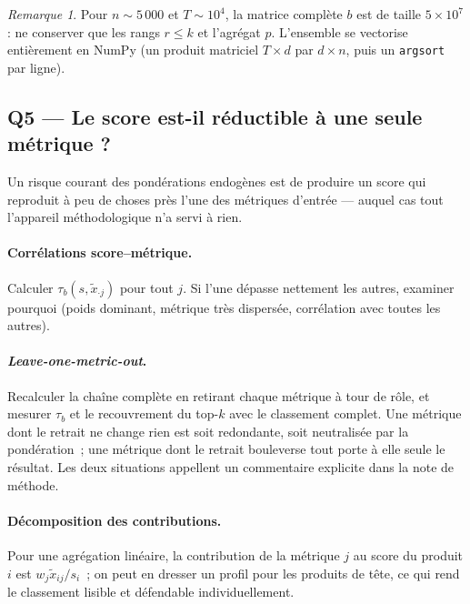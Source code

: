 \documentclass[11pt,a4paper]{article}
\theoremstyle{definition}
\theoremstyle{remark}
\newtheorem{remarque}{Remarque}[section]
\begin{document}
\bigskip

\begin{remarque}
  Pour $n \sim 5\,000$ et $T \sim 10^4$, la matrice complète $b$ est de taille $5\times10^7$: ne
  conserver que les rangs $r \le k$ et l'agrégat $p$. L'ensemble se vectorise entièrement en NumPy
  (un produit matriciel $T \times d$ par $d \times n$, puis un \texttt{argsort} par ligne).
\end{remarque}

\bigskip

\subsection{Q5 --- Le score est-il réductible à une seule métrique ?}

\medskip

Un risque courant des pondérations endogènes est de produire un score qui reproduit à peu de
choses près l'une des métriques d'entrée --- auquel cas tout l'appareil méthodologique n'a servi
à rien.

\medskip

\paragraph{Corrélations score--métrique.} Calculer $\tau_b(s, \tilde{x}_{\cdot j})$ pour tout $j$.
Si l'une dépasse nettement les autres, examiner pourquoi (poids dominant, métrique très
dispersée, corrélation avec toutes les autres).

\medskip

\paragraph{\emph{Leave-one-metric-out}.} Recalculer la chaîne complète en retirant chaque métrique
à tour de rôle, et mesurer $\tau_b$ et le recouvrement du top-$k$ avec le classement complet. Une
métrique dont le retrait ne change rien est soit redondante, soit neutralisée par la pondération~;
une métrique dont le retrait bouleverse tout porte à elle seule le résultat. Les deux situations
appellent un commentaire explicite dans la note de méthode.

\medskip

\paragraph{Décomposition des contributions.} Pour une agrégation linéaire, la contribution de la
métrique $j$ au score du produit $i$ est $w_j \tilde{x}_{ij} / s_i$~; on peut en dresser un profil
pour les produits de tête, ce qui rend le classement lisible et défendable individuellement.
\end{document}
